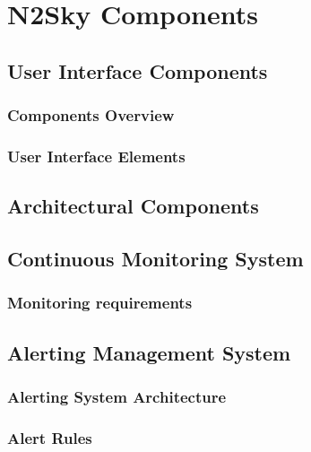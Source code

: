 \section{N2Sky Components}\label{N2Sky Components}

\subsection{User Interface Components}\label{User Interface Components}
\subsubsection{Components Overview}\label{Components Overview}
\subsubsection{User Interface Elements}\label{User Interface Elements}

\subsection{Architectural Components}\label{Architectural Components}

\subsection{Continuous Monitoring System}\label{Continuous Monitoring System}
\subsubsection{Monitoring requirements}\label{Monitoring requirements}

\subsection{Alerting Management System}\label{Alerting Management System}
\subsubsection{Alerting System Architecture}\label{Alerting System Architecture}
\subsubsection{Alert Rules}\label{Alert Rules}
